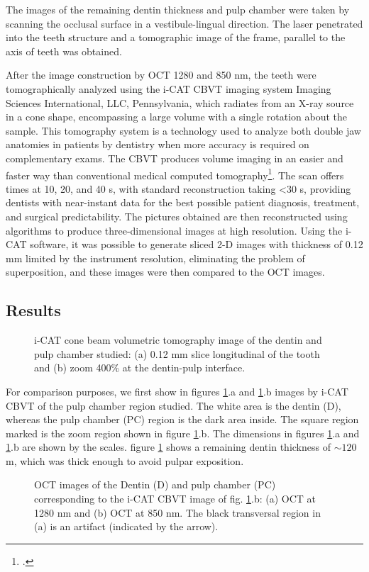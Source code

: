 \documentclass[12pt,twoside,english]{book}
\renewcommand{\~}{\perispomeni}%
\DeclareRobustCommand{\textgreek}[1]{\leavevmode{\greektext #1}}
\numberwithin{equation}{section}
\numberwithin{figure}{section}
\begin{document}
The images of the remaining dentin thickness and pulp chamber were taken by scanning the occlusal surface in a vestibule-lingual direction. The laser penetrated into the teeth structure and a tomographic image of the frame, parallel to the axis of teeth was obtained. 

After the image construction by OCT 1280 and 850 nm, the teeth were tomographically analyzed using the i-CAT \gls{CBVT} imaging system Imaging Sciences International, LLC, Pennsylvania, which radiates from an X-ray source in a cone shape, encompassing a large volume with a single rotation about the sample. This tomography system is a technology used to analyze both double jaw anatomies in patients by dentistry when more accuracy is required on complementary exams. The CBVT produces volume imaging in an easier and faster way than conventional medical computed tomography\footcite{Danforth:2003p2286}. The scan offers times at 10, 20, and 40 s, with standard reconstruction taking <30 s, providing dentists with near-instant data for the best possible patient diagnosis, treatment, and surgical predictability. The pictures obtained are then reconstructed using algorithms to produce three-dimensional images at high resolution. Using the i-CAT software, it was possible to generate sliced 2-D images with thickness of 0.12 mm limited by the instrument resolution, eliminating the problem of superposition, and these images were then compared to the OCT images. 

\subsection{Results}
\begin{figure}[h]
\centering{}
\caption{i-CAT cone beam volumetric tomography image of the dentin and pulp chamber studied: (a) 0.12 mm slice longitudinal of the tooth and (b) zoom 400\% at the dentin-pulp interface.\label{fig:i-CAT tomography}}
\end{figure}

For comparison purposes, we first show in figures \ref{fig:i-CAT tomography}.a and \ref{fig:i-CAT tomography}.b images by i-CAT CBVT of the pulp chamber region studied. The white area is the dentin (D), whereas the pulp chamber (PC) region is the dark area inside. The square region marked is the zoom region shown in figure \ref{fig:i-CAT tomography}.b. The dimensions in figures \ref{fig:i-CAT tomography}.a and \ref{fig:i-CAT tomography}.b are shown by the scales. figure \ref{fig:i-CAT tomography} shows a remaining dentin thickness of $\sim120$ \textgreek{m}m, which was thick enough to avoid pulpar exposition.
\begin{figure}[h]
\centering{}
\caption{OCT images of the Dentin (D) and pulp chamber (PC) corresponding to the i-CAT CBVT image of fig. \ref{fig:i-CAT tomography}.b: (a) OCT at 1280 nm and (b) OCT at 850 nm. The black transversal region in (a) is an artifact (indicated by the arrow).\label{fig:OCT dentin pulp chamber}}
\end{figure}
\end{document}
